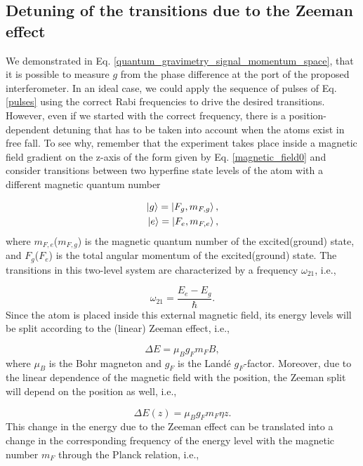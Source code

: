 \documentclass{article}
\begin{document}
\subsection{Detuning of the transitions due to the Zeeman effect}
We demonstrated in Eq. \ref{quantum_gravimetry_signal_momentum_space}, that it is possible to measure $g$ from the phase difference at the port of the proposed interferometer. In an ideal case, we could apply the sequence of pulses of Eq. \ref{pulses} using the correct Rabi frequencies to drive the desired transitions. However, even if we started with the correct frequency, there is a position-dependent detuning that has to be taken into account when the atoms exist in free fall. To see why, remember that the experiment takes place inside a magnetic field gradient on the z-axis of the form given by Eq. \ref{magnetic_field0} and consider transitions between two hyperfine state levels of the atom with a different magnetic quantum number

\begin{equation}\label{hyperfine_levels}
\begin{aligned}
\ket{g} = \ket{F_{g}, m_{F, g}}, \\
\ket{e} = \ket{F_{e}, m_{F, e}},
\end{aligned}
\end{equation}
%
where $m_{F, e}$($m_{F, g}$) is the magnetic quantum number of the excited(ground) state, and $F_{g}$($F_{e}$) is the total angular momentum of the excited(ground) state.
The transitions in this two-level system are characterized by a frequency  $\omega_{21}$, i.e.,

\begin{equation}
  \omega_{21} = \frac{E_{e}-E_{g}}{\hbar}.
\end{equation}
%
Since the atom is placed inside this external magnetic field, its energy levels will be split according to the (linear) Zeeman effect, i.e.,

\begin{equation}\label{linear_zeeman_eq}
  \Delta E = \mu_{B} g_{F} m_{F} B,
\end{equation}
%
where $\mu_{B}$ is the Bohr magneton and $g_{F}$ is the Landé $g_{F}$-factor. Moreover, due to the linear dependence of the magnetic field with the position, the Zeeman split will depend on the position as well, i.e.,

\begin{equation}
  \Delta E(z) = \mu_{B} g_{F} m_{F} \eta z.
\end{equation}
%
This change in the energy due to the Zeeman effect can be translated into a change in the corresponding frequency of the energy level with the magnetic number $m_{F}$ through the Planck relation, i.e.,
\end{document}
